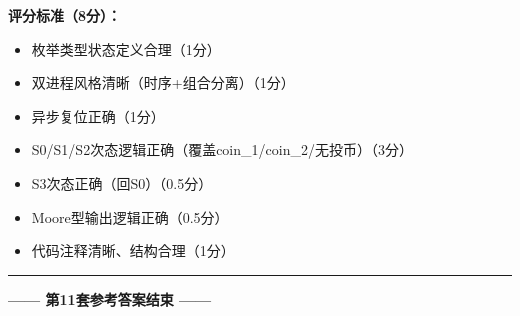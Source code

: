 \textbf{评分标准（8分）：}
\begin{itemize}
  \item 枚举类型状态定义合理\hfill（1分）
  \item 双进程风格清晰（时序+组合分离）\hfill（1分）
  \item 异步复位正确\hfill（1分）
  \item S0/S1/S2次态逻辑正确（覆盖coin\_1/coin\_2/无投币）\hfill（3分）
  \item S3次态正确（回S0）\hfill（0.5分）
  \item Moore型输出逻辑正确\hfill（0.5分）
  \item 代码注释清晰、结构合理\hfill（1分）
\end{itemize}

\vspace{0.5cm}
{\centering
\rule{0.8\textwidth}{0.5pt}
\vspace{0.3cm}

\textbf{—— 第11套参考答案结束 ——}

\vspace{0.5cm}}

\endinput

